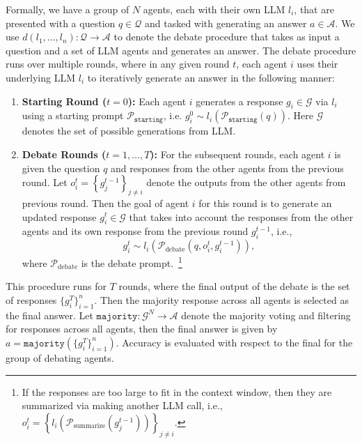 \documentclass{article}
\newcommand{\set}[1]{\left\{ #1 \right\}}
\begin{document}
Formally, we have a group of $N$ agents, each with their own LLM $l_i$, that are presented with a question $q \in \mathcal{Q}$ and tasked with generating an answer $a \in \mathcal{A}$. We use $d(l_1, \ldots, l_n): \mathcal{Q} \rightarrow \mathcal{A}$ to denote the debate procedure that takes as input a question and a set of LLM agents and generates an answer. The debate procedure runs over multiple rounds, where in any given round $t$, each agent $i$ uses their underlying LLM $l_i$ to iteratively generate an answer in the following manner:
\begin{enumerate}
    \item \textbf{Starting Round ($t=0$):} Each agent $i$ generates a response $g_i \in \mathcal{G}$ via $l_i$ using a starting prompt $\mathcal{P}_{\texttt{starting}}$, i.e.
    $g_i^0 \sim l_i(\mathcal{P}_{\texttt{starting}}(q))$. Here $\mathcal{G}$ denotes the set of possible generations from LLM.

    \item \textbf{Debate Rounds ($t=1, \ldots, T$):} For the subsequent rounds, each agent $i$ is given the question $q$ and responses from the other agents from the previous round.
          Let $o_i^{t} = \set{ g_j^{t-1} }_{j \neq i }$ denote the outputs from the other agents from previous round. Then the goal of agent $i$ for this round is to generate an updated response $g^t_i \in \mathcal{G}$ that takes into account the responses from the other agents and its own response from the previous round $g^{t-1}_i$, i.e.,
          \begin{equation*}
              g^t_i \sim l_i(\mathcal{P}_{\text{debate}}(q, o^t_i, g^{t-1}_i)),
          \end{equation*}
          where $\mathcal{P}_{\text{debate}}$ is the debate prompt.~\footnote{If the responses are too large to fit in the context window, then they are summarized via making another LLM call, i.e., $o_i^{t} = \set{ l_i(\mathcal{P}_{\text{summarize}}(g_j^{t-1}))}_{j \neq i }$.}
\end{enumerate}
This procedure runs for $T$ rounds, where the final output of the debate is the set of responses $\{g^T_i\}_{i=1}^n$. Then the majority response across all agents is selected as the final answer. Let $\texttt{majority} : \mathcal{G}^N \rightarrow \mathcal{A}$ denote the majority voting and filtering for responses across all agents, then the final answer is given by $a = \texttt{majority}(\{g^T_i\}_{i=1}^n)$. Accuracy is evaluated with respect to the final for the group of debating agents.
\end{document}
